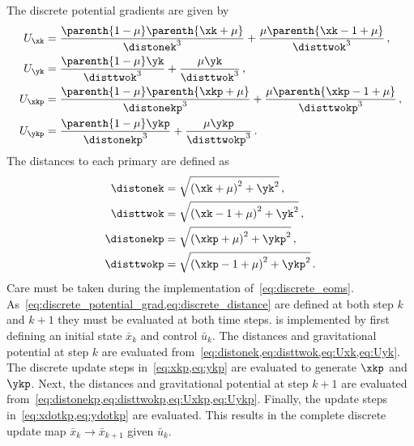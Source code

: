 The discrete potential gradients are given by
\begin{subequations}\label{eq:discrete_potential_grad}
\begin{align}
	U_{\xk} &= \frac{\parenth{1 -\mu} \parenth{\xk + \mu}}{\distonek^3} + \frac{ \mu \parenth{\xk -1 + \mu}}{\disttwok^3} \label{eq:Uxk} \, ,\\
	U_{\yk} &= \frac{\parenth{1 -\mu} \yk}{\disttwok^3} + \frac{ \mu \yk}{\disttwok^3} \label{eq:Uyk} \, ,\\
	U_{\xkp} &= \frac{\parenth{1 -\mu} \parenth{\xkp + \mu}}{\distonekp^3} + \frac{ \mu \parenth{\xkp -1 + \mu}}{\disttwokp^3} \label{eq:Uxkp}\, ,\\
	U_{\ykp} &= \frac{\parenth{1 -\mu} \ykp}{\distonekp^3} + \frac{ \mu \ykp}{\disttwokp^3} \label{eq:Uykp} \, .
\end{align}	
\end{subequations}
The distances to each primary are defined as
\begin{subequations}\label{eq:discrete_distance}
\begin{align}
	\distonek &= \sqrt{\left( \xk + \mu\right)^2 + \yk^2} \label{eq:distonek}\, ,\\
	\disttwok &= \sqrt{\left( \xk - 1 + \mu\right)^2 + \yk^2} \label{eq:disttwok}\, ,\\
	\distonekp &= \sqrt{\left( \xkp + \mu\right)^2 + \ykp^2} \label{eq:distonekp}\, ,\\
	\disttwokp &= \sqrt{\left( \xkp - 1 + \mu\right)^2 + \ykp^2} \label{eq:disttwokp} \, .
\end{align}
\end{subequations}
Care must be taken during the implementation of~\cref{eq:discrete_eoms}.
As~\cref{eq:discrete_potential_grad,eq:discrete_distance} are defined at both step \( k \) and \( k+1 \) they must be evaluated at both time steps.
 is implemented by first defining an initial state \( \bar{x}_k \) and control \( \bar{u}_k \).
The distances and gravitational potential at step \( k \) are evaluated from~\cref{eq:distonek,eq:disttwok,eq:Uxk,eq:Uyk}.
The discrete update steps in~\cref{eq:xkp,eq:ykp} are evaluated to generate \( \xkp \) and \( \ykp\).
Next, the distances and gravitational potential at step \( k+1 \) are evaluated from~\cref{eq:distonekp,eq:disttwokp,eq:Uxkp,eq:Uykp}. 
Finally, the update steps in~\cref{eq:xdotkp,eq:ydotkp} are evaluated.
This results in the complete discrete update map \( \bar{x}_k \to \bar{x}_{k+1} \) given \( \bar{u}_k \).

